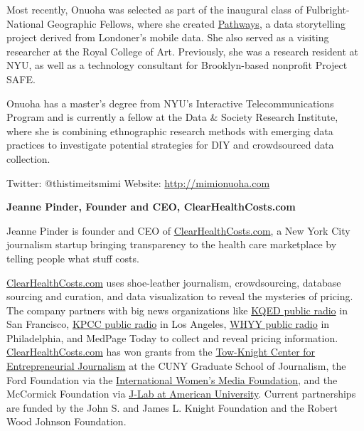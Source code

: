 \begin{itemize}
\begin{itemize}
Most recently, Onuoha was selected as part of the inaugural class of Fulbright-National Geographic Fellows, where she created \href{http://www.nationalgeographic.com/pathways}{Pathways},\autocite{Pathways} a data storytelling project derived from Londoner’s mobile data. She also served as a visiting researcher at the Royal College of Art. Previously, she was a research resident at NYU, as well as a technology consultant for Brooklyn-based nonprofit Project SAFE. 

Onuoha has a master’s degree from NYU’s Interactive Telecommunications Program and is currently a fellow at the Data & Society Research Institute, where she is combining ethnographic research methods with emerging data practices to investigate potential strategies for DIY and crowdsourced data collection.

Twitter: @thistimeitsmimi 
Website: \href{http://mimionuoha.com}{http://mimionuoha.com}

\textbf{Jeanne Pinder, Founder and CEO, ClearHealthCosts.com}

Jeanne Pinder is founder and CEO of \href{http://clearhealthcosts.com/}{ClearHealthCosts.com}, a New York City journalism startup bringing transparency to the health care marketplace by telling people what stuff costs. 

\href{http://clearhealthcosts.com/}{ClearHealthCosts.com} uses shoe-leather journalism, crowdsourcing, database sourcing and curation, and data visualization to reveal the mysteries of pricing. The company partners with big news organizations like \href{http://ww2.kqed.org/stateofhealth/2014/06/23/share-your-bill-make-health-costs-transparent-in-california/}{KQED public radio} in San Francisco, \href{http://www.scpr.org/price-check}{KPCC public radio} in Los Angeles, \href{http://www.newsworks.org/index.php/local/item/77899}{WHYY public radio} in Philadelphia, and MedPage Today to collect and reveal pricing information. \href{http://clearhealthcosts.com/}{ClearHealthCosts.com} has won grants from the \href{http://towknight.org/2010/12/2010awards/}{Tow-Knight Center for Entrepreneurial Journalism} at the CUNY Graduate School of Journalism, the Ford Foundation via the \href{http://www.iwmf.org/women-entrepreneurs-in-digital-news-jeanne-pinder/}{International Women’s Media Foundation}, and the McCormick Foundation via \href{http://www.newmediawomen.org/site/2012_winners}{J-Lab at American University}. Current partnerships are funded by the John S. and James L. Knight Foundation and the Robert Wood Johnson Foundation.


\end{itemize}
\end{itemize}
